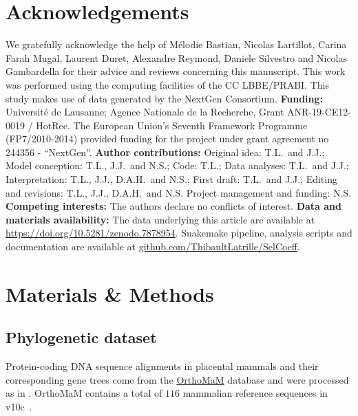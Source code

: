 \documentclass{article}
\begin{document}
    \section*{Acknowledgements}
    \label{sec:acknowledgment}
    We gratefully acknowledge the help of Mélodie Bastian, Nicolas Lartillot, Carina Farah Mugal, Laurent Duret, Alexandre Reymond, Daniele Silvestro and Nicolas Gambardella for their advice and reviews concerning this manuscript.
    This work was performed using the computing facilities of the CC LBBE/PRABI\@.
    This study makes use of data generated by the NextGen Consortium.
    \textbf{Funding:}
    Université de Lausanne; Agence Nationale de la Recherche, Grant ANR-19-CE12-0019 / HotRec.
    The European Union’s Seventh Framework Programme (FP7/2010-2014) provided funding for the project under grant agreement no 244356 - “NextGen”.
    \textbf{Author contributions:}
    Original idea: T.L.\ and J.J.;
    Model conception: T.L., J.J.\ and N.S.;
    Code: T.L.;
    Data analyses: T.L.\ and J.J.;
    Interpretation: T.L., J.J., D.A.H.\ and N.S.;
    First draft: T.L.\ and J.J.;
    Editing and revisions: T.L., J.J., D.A.H.\ and N.S.
    Project management and funding: N.S\@.
    \textbf{Competing interests:}
    The authors declare no conflicts of interest.
    \textbf{Data and materials availability:}
    The data underlying this article are available at \url{https://doi.org/10.5281/zenodo.7878954}.
    Snakemake pipeline, analysis scripts and documentation are available at \href{https://github.com/ThibaultLatrille/SelCoeff}{github.com/ThibaultLatrille/SelCoeff}.


    \section{Materials \& Methods}
    \label{sec:methods}

    \subsection{Phylogenetic dataset}\label{subsec:phylo-dataset}

    Protein-coding DNA sequence alignments in placental mammals and their corresponding gene trees come from the \href{https://www.orthomam.univ-montp2.fr}{OrthoMaM} database and were processed as in \textcite{latrille_genes_2023}.
    OrthoMaM contains a total of $116$ mammalian reference sequences in v10c~\cite{ranwez_orthomam_2007, douzery_orthomam_2014, scornavacca_orthomam_2019}.
\end{document}
